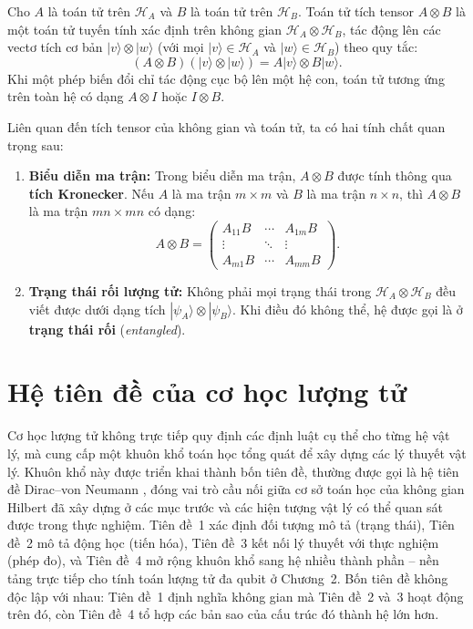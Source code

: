     \begin{definition}
    Cho $A$ là toán tử trên $\mathcal{H}_A$ và $B$ là toán tử trên $\mathcal{H}_B$.
    Toán tử tích tensor $A \otimes B$ là một toán tử tuyến tính xác định trên không gian $\mathcal{H}_A \otimes \mathcal{H}_B$, tác động lên các vectơ tích cơ bản $|v\rangle \otimes |w\rangle$ (với mọi $|v\rangle \in \mathcal{H}_A$ và $|w\rangle \in \mathcal{H}_B$) theo quy tắc:
    $$(A \otimes B)(|v\rangle \otimes |w\rangle) = A|v\rangle \otimes B|w\rangle.$$
    Khi một phép biến đổi chỉ tác động cục bộ lên một hệ con, toán tử tương ứng trên
    toàn hệ có dạng $A \otimes I$ hoặc $I \otimes B$.
    \end{definition}
    
    \begin{remark}
    Liên quan đến tích tensor của không gian và toán tử, ta có hai tính chất quan trọng sau:
    \begin{enumerate}[label=(\roman*)]
        \item \textbf{Biểu diễn ma trận:} Trong biểu diễn ma trận, $A \otimes B$ được tính thông qua \textbf{tích Kronecker}. Nếu $A$ là ma trận $m \times m$ và $B$ là ma trận $n \times n$, thì $A \otimes B$ là ma trận $mn \times mn$ có dạng:
        $$A \otimes B =
        \begin{pmatrix}
        A_{11}B & \cdots & A_{1m}B \\
        \vdots  & \ddots & \vdots  \\
        A_{m1}B & \cdots & A_{mm}B
        \end{pmatrix}.$$
    
        \item \textbf{Trạng thái rối lượng tử:} Không phải mọi trạng thái trong $\mathcal{H}_A \otimes \mathcal{H}_B$ đều viết được dưới dạng tích $|\psi_A\rangle \otimes |\psi_B\rangle$. Khi điều đó không thể, hệ được gọi là ở \textbf{trạng thái rối} (\textit{entangled}).
    \end{enumerate}
    \end{remark}

\section{Hệ tiên đề của cơ học lượng tử}
\label{sec:postulates}

Cơ học lượng tử không trực tiếp quy định các định luật cụ thể cho từng hệ vật lý,
mà cung cấp một khuôn khổ toán học tổng quát để xây dựng các lý thuyết vật lý.
Khuôn khổ này được triển khai thành bốn tiên đề, thường được gọi là hệ tiên đề
Dirac--von Neumann \cite{ref5}, đóng vai trò cầu nối giữa cơ sở toán học của không
gian Hilbert đã xây dựng ở các mục trước và các hiện tượng vật lý có thể quan sát
được trong thực nghiệm. Tiên đề~1 xác định
đối tượng mô tả (trạng thái), Tiên đề~2 mô tả động học (tiến hóa), Tiên đề~3 kết
nối lý thuyết với thực nghiệm (phép đo), và Tiên đề~4 mở rộng khuôn khổ sang hệ
nhiều thành phần -- nền tảng trực tiếp cho tính toán lượng tử đa qubit ở Chương~2.
Bốn tiên đề không độc lập với nhau: Tiên đề~1 định nghĩa không gian mà Tiên đề~2
và~3 hoạt động trên đó, còn Tiên đề~4 tổ hợp các bản sao của cấu trúc đó thành hệ
lớn hơn.

